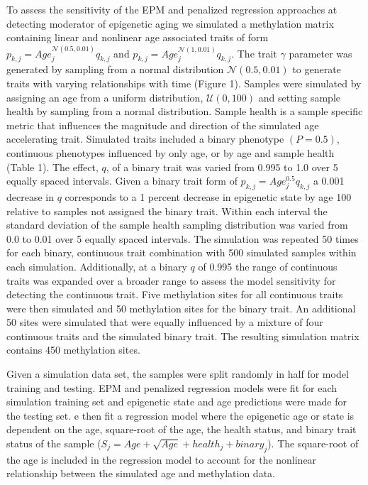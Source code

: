 \documentclass{article}
\begin{document}
{{\begin{linenumbers}
To assess the sensitivity of the EPM and penalized regression approaches at detecting moderator of epigenetic aging we 
simulated a methylation matrix containing linear and nonlinear age associated traits of form 
$p_{k,j} = Age_j^{\mathcal{N}(0.5, 0.01)} q_{k,j}$ and $p_{k,j} = Age_j^{\mathcal{N}(1, 0.01)} q_{k,j}$. The 
trait $\gamma$ parameter was generated by sampling from a normal distribution $\mathcal{N}(0.5, 0.01)$ to generate 
traits with varying relationships with time (Figure 1). Samples were simulated by assigning an age from a uniform 
distribution, $\mathcal{U}(0,100)$ and setting sample health  by sampling from a normal distribution. Sample health 
is a sample specific metric that influences the magnitude and direction of the simulated age accelerating trait. 
Simulated traits included a binary phenotype  $(P=0.5)$, continuous phenotypes influenced by only age, or by age and 
sample health (Table 1). The effect, $q$, of a binary trait was varied from 0.995 to 1.0 over 5 equally spaced 
intervals. Given a binary trait form of $p_{k,j} = Age_j^{0.5} q_{k,j}$ a 0.001 decrease in $q$ corresponds to a 
1 percent decrease in epigenetic state by age 100 relative to samples not assigned the binary trait. Within each 
interval the standard deviation of the sample health sampling distribution was varied from 0.0 to 0.01 over 5 
equally spaced intervals. The simulation was repeated 50 times for each binary, continuous trait combination with 
500 simulated samples within each simulation. Additionally, at a binary $q$ of 0.995 the range of continuous traits 
was expanded over a broader range to assess the model sensitivity for detecting the continuous trait. Five methylation 
sites for all continuous traits were then simulated and 50 methylation sites for the binary trait. An additional 50 
sites were simulated that were equally influenced by a mixture of four continuous traits and the simulated  binary 
trait. The resulting simulation matrix contains 450 methylation sites. 

Given a simulation data set, the samples were split randomly in half for model training and testing. EPM and penalized 
regression models were fit for each simulation training set and epigenetic state and age predictions were made for the 
testing set. e then fit a regression model where the epigenetic age or state is dependent on the age, square-root of 
the age, the health status, and binary trait status of the sample ($S_j  = Age + \sqrt{Age} + health_j + binary_j$). 
The square-root of the age is included in the regression model to account for the nonlinear relationship between the 
simulated age and methylation data. 


\end{linenumbers}}}
\end{document}
